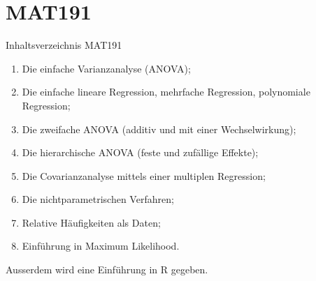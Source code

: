 \documentclass[handout]{beamer}
\begin{document}
\appendix
\section*{MAT191}
\begin{frame}{Inhaltsverzeichnis MAT191}
\begin{enumerate}
\item Die einfache Varianzanalyse (ANOVA);
\item Die einfache lineare Regression, mehrfache Regression, polynomiale Regression;
\item Die zweifache ANOVA (additiv und mit einer Wechselwirkung);
\item Die hierarchische ANOVA (feste und zufällige Effekte);
\item Die Covarianzanalyse mittels einer multiplen Regression;
\item Die nichtparametrischen Verfahren;
\item Relative Häufigkeiten als Daten;
\item Einführung in Maximum Likelihood.
\end{enumerate}
Ausserdem wird eine Einführung in R gegeben.
\end{frame}
\end{document}
